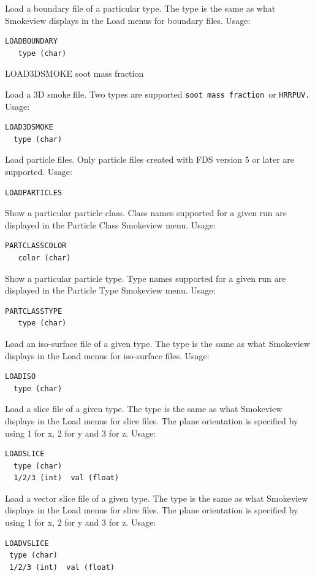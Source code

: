 \documentclass[11pt,twoside]{book}
\newcommand{\hitem}[1]{\item[{\bf #1} \hfill]}
\begin{document}
\hitem{LOADBOUNDARY} Load a boundary file of a particular type.
The type is the same as what Smokeview displays in the Load menus for boundary files.
Usage:
\begin{verbatim}
LOADBOUNDARY
   type (char)
\end{verbatim}
LOAD3DSMOKE
 soot mass fraction

\hitem{LOAD3DSMOKE}
Load a 3D smoke file.  Two types are supported {\tt soot mass fraction}\ or {\tt HRRPUV.}
Usage:
\begin{verbatim}
LOAD3DSMOKE
  type (char)
\end{verbatim}

\hitem{LOADPARTICLES}Load particle files.  Only particle files created with FDS version 5 or
later are supported.
Usage:
\begin{verbatim}
LOADPARTICLES
\end{verbatim}

\hitem{PARTCLASSCOLOR}Show a particular particle class.  Class names supported for a given
run are displayed in the Particle Class Smokeview menu.
Usage:
\begin{verbatim}
PARTCLASSCOLOR
   color (char)
\end{verbatim}

\hitem{PARTCLASSTYPE}Show a particular particle type.  Type names supported for a given
run are displayed in the Particle Type Smokeview menu.
Usage:
\begin{verbatim}
PARTCLASSTYPE
   type (char)
\end{verbatim}

\hitem{LOADISO}Load an iso-surface file of a given type.  The type is the same as what Smokeview displays in the Load menus for iso-surface files.
Usage:
\begin{verbatim}
LOADISO
  type (char)
\end{verbatim}

\hitem{LOADSLICE}Load a slice file of a given type.  The type is the same as what Smokeview displays in the Load menus for slice files.  The plane orientation is specified by using 1 for x, 2 for y and 3 for z.
Usage:
\begin{verbatim}
LOADSLICE
  type (char)
  1/2/3 (int)  val (float)
\end{verbatim}

\hitem{LOADVSLICE}Load a vector slice file of a given type.  The type is the same as what Smokeview displays in the Load menus for slice files.  The plane orientation is specified by using 1 for x, 2 for y and 3 for z.
Usage:
\begin{verbatim}
LOADVSLICE
 type (char)
 1/2/3 (int)  val (float)
\end{verbatim}
\end{document}
